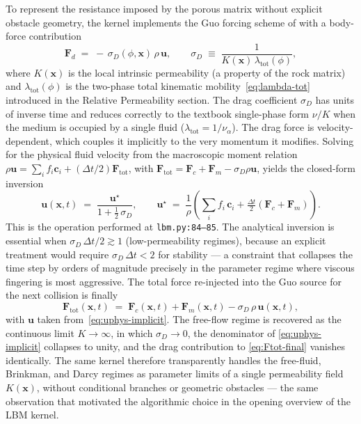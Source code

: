 To represent the resistance imposed by the porous matrix without explicit obstacle geometry, the kernel implements the Guo forcing scheme of \cite{guo2002discrete} with a body-force contribution
\begin{equation}
\bm{F}_d \;=\; -\,\sigma_D(\phi, \bm{x})\,\rho\,\bm{u},
\qquad
\sigma_D \;\equiv\; \frac{1}{K(\bm{x})\,\lambda_{\mathrm{tot}}(\phi)},
\label{eq:Fd-twophase}
\end{equation}
where $K(\bm{x})$ is the local intrinsic permeability (a property of the rock matrix) and $\lambda_{\mathrm{tot}}(\phi)$ is the two-phase total kinematic mobility~\eqref{eq:lambda-tot} introduced in the Relative Permeability section.
The drag coefficient $\sigma_D$ has units of inverse time and reduces correctly to the textbook single-phase form $\nu/K$ when the medium is occupied by a single fluid ($\lambda_{\mathrm{tot}} = 1/\nu_\alpha$).
The drag force is velocity-dependent, which couples it implicitly to the very momentum it modifies.
Solving for the physical fluid velocity from the macroscopic moment relation $\rho\bm{u} = \sum_i f_i\bm{c}_i + (\Delta t/2)\bm{F}_{\mathrm{tot}}$, with $\bm{F}_{\mathrm{tot}} = \bm{F}_c + \bm{F}_m - \sigma_D\rho\bm{u}$, yields the closed-form inversion
\begin{equation}
\boxed{\; \bm{u}(\bm{x}, t)
\;=\; \frac{\bm{u}^{\star}}{1 + \tfrac{1}{2}\,\sigma_D},
\qquad
\bm{u}^{\star}
\;=\; \frac{1}{\rho}\!\left(\sum_i f_i\,\bm{c}_i
+ \tfrac{\Delta t}{2}(\bm{F}_c + \bm{F}_m)\right).
\;}
\label{eq:uphys-implicit}
\end{equation}
This is the operation performed at \texttt{lbm.py:84--85}.
The analytical inversion is essential when $\sigma_D\,\Delta t/2 \gtrsim 1$ (low-permeability regimes), because an explicit treatment would require $\sigma_D\,\Delta t < 2$ for stability --- a constraint that collapses the time step by orders of magnitude precisely in the parameter regime where viscous fingering is most aggressive.
The total force re-injected into the Guo source for the next collision is finally
\begin{equation}
\bm{F}_{\mathrm{tot}}(\bm{x}, t)
\;=\; \bm{F}_c(\bm{x}, t) + \bm{F}_m(\bm{x}, t) - \sigma_D\,\rho\,\bm{u}(\bm{x}, t),
\label{eq:Ftot-final}
\end{equation}
with $\bm{u}$ taken from~\eqref{eq:uphys-implicit}.
The free-flow regime is recovered as the continuous limit $K\to\infty$, in which $\sigma_D \to 0$, the denominator of \eqref{eq:uphys-implicit} collapses to unity, and the drag contribution to \eqref{eq:Ftot-final} vanishes identically.
The same kernel therefore transparently handles the free-fluid, Brinkman, and Darcy regimes as parameter limits of a single permeability field $K(\bm{x})$, without conditional branches or geometric obstacles --- the same observation that motivated the algorithmic choice in the opening overview of the LBM kernel.

